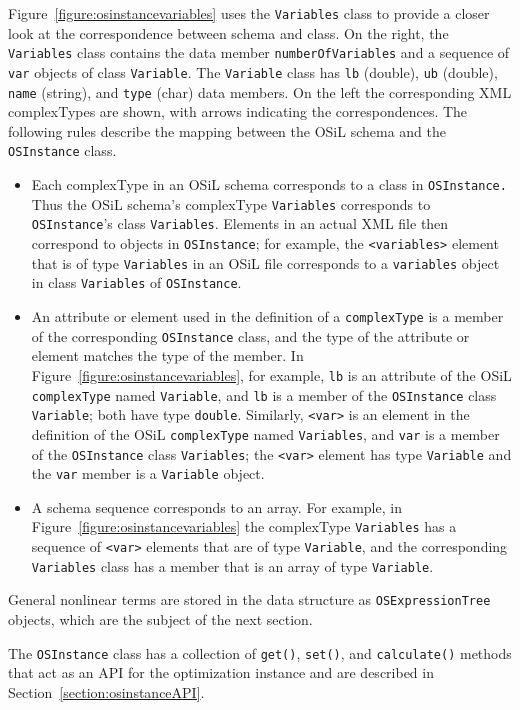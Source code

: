 \documentclass[11pt]{article}
\newcounter{Fig}
\renewcommand{\_}{{\char"5F}}
\renewcommand{\{}{{\char"7B}}
\renewcommand{\}}{{\char"7D}}
\renewcommand{\^}{{\char"0D}}
\renewcommand{\'}{{\char"0D}}
\newcommand{\Titem}{\item[$\triangleright$]}
\begin{document}
\begin{enumerate}[Step 1:]
Figure~\ref{figure:osinstancevariables} uses the {\tt Variables} class to provide a closer look 
at the correspondence between schema and class. On the right, the {\tt Variables} class contains 
the data member {\tt numberOfVariables} and a sequence of {\tt var} objects of class {\tt Variable}. 
The {\tt Variable} class has {\tt lb} (double), {\tt ub} (double), {\tt name} (string), and {\tt type} 
(char) data members. On the left the corresponding XML complexTypes are shown, with arrows indicating 
the correspondences. The following rules describe the mapping between the OSiL schema and the 
{\tt OSInstance} class.
%
\begin{itemize}

\Titem  Each complexType in an OSiL schema corresponds to a class in {\tt OSInstance.}
Thus the OSiL schema's complexType {\tt Variables} corresponds to {\tt OSInstance}'s class {\tt Variables}.
Elements in an actual XML file then correspond to objects in {\tt OSInstance};
for example, the {\tt <variables>} element that is of type {\tt Variables} in an OSiL file
corresponds to a {\tt variables} object in class {\tt Variables} of {\tt OSInstance}.

\Titem An attribute or element used in the definition of a {\tt complexType} is a member of the 
corresponding {\tt OSInstance} class, and the type of the attribute or element matches the type 
of the member.  In Figure~\ref{figure:osinstancevariables}, for example, {\tt lb} is an attribute 
of the OSiL {\tt complexType} named {\tt Variable}, and {\tt lb} is a member of the {\tt OSInstance} 
class {\tt Variable}; both have type {\tt double}.  Similarly, {\tt <var>} is an element in the definition 
of the OSiL {\tt complexType} named {\tt Variables}, and {\tt var} is a member of the {\tt OSInstance} 
class {\tt Variables}; the {\tt <var>} element has type {\tt Variable} and the {\tt var} member is a 
{\tt Variable} object.

\Titem A schema sequence corresponds to an array. For example, in Figure~\ref{figure:osinstancevariables} the complexType {\tt Variables} has a sequence of {\tt <var>} elements that are of type {\tt Variable}, and the corresponding {\tt Variables} class has a member that is an array of type {\tt Variable}.

\end{itemize}
%
General nonlinear terms are stored in the data structure as {\tt OSExpressionTree} objects, which are the subject of the next section.

     The {\tt OSInstance} class has a collection of {\tt get()}, {\tt set()}, and {\tt calculate()} methods 
that act as an API for the optimization instance and are described in Section~\ref{section:osinstanceAPI}.





\end{enumerate}
\end{document}
